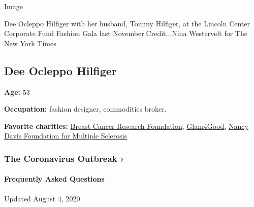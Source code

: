 Image

Dee Ocleppo Hilfiger with her husband, Tommy Hilfiger, at the Lincoln
Center Corporate Fund Fashion Gala last November.Credit...Nina
Westervelt for The New York Times

\hypertarget{dee-ocleppo-hilfiger}{%
\subsection{Dee Ocleppo Hilfiger}\label{dee-ocleppo-hilfiger}}

\textbf{Age:} 53

\textbf{Occupation:} fashion designer, commodities broker.

\textbf{Favorite charities:} \href{https://www.bcrf.org}{Breast Cancer
Research Foundation}, \href{https://glam4good.com}{Glam4Good,}
\href{https://www.erasems.org}{Nancy Davis Foundation for Multiple
Sclerosis}

\href{https://www.nytimes.com/news-event/coronavirus?action=click\&pgtype=Article\&state=default\&region=MAIN_CONTENT_3\&context=storylines_faq}{}

\hypertarget{the-coronavirus-outbreak-}{%
\subsubsection{The Coronavirus Outbreak
›}\label{the-coronavirus-outbreak-}}

\hypertarget{frequently-asked-questions}{%
\paragraph{Frequently Asked
Questions}\label{frequently-asked-questions}}

Updated August 4, 2020

